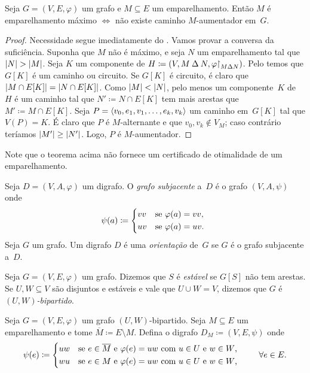 \documentclass[10pt,reqno]{amsart}
\begin{document}
\begin{theorem}
  Seja \(G = (V,E,\varphi)\) um grafo e \(M \subseteq E\) um
  emparelhamento.  Então \(M\) é emparelhamento máximo \(\iff\) não
  existe caminho \(M\)-aumentador em~\(G\).
\end{theorem}
\begin{proof}
  Necessidade segue imediatamente do .  Vamos provar a
  conversa da suficiência.  Suponha que \(M\) não é máximo, e seja
  \(N\) um emparelhamento tal que \(\lvert N\rvert > \lvert M\rvert\).  Seja \(K\)
  um componente de
  \(H \coloneqq (V, M \mathbin{\Delta} N, \varphi\mathord{\restriction}_{M
    \mathbin{\Delta} N})\).  Pelo  temos que \(G[K]\) é um
  caminho ou circuito.  Se \(G[K]\) é circuito, é claro que
  \(\lvert M \cap E[K]\rvert = \lvert N \cap E[K]\rvert\).  Como
  \(\lvert M\rvert < \lvert N\rvert\), pelo menos um componente~\(K\) de~\(H\) é
  um caminho tal que \(N' \coloneqq N \cap E[K]\) tem mais arestas que
  \(M' \coloneqq M \cap E[K]\).  Seja
  \(P = \langle v_0,e_1,v_1,\dotsc,e_k,v_k\rangle\) um caminho em~\(G[K]\) tal
  que \(V(P) = K\).  É claro que \(P\) é \(M\)-alternante e que
  \(v_0, v_k \not\in V_M\); caso contrário teríamos
  \(\lvert M'\rvert \geq \lvert N'\rvert\).  Logo, \(P\) é \(M\)-aumentador.
\end{proof}

Note que o teorema acima não fornece um certificado de otimalidade de
um emparelhamento.

Seja \(D = (V,A,\varphi)\) um digrafo.  O \emph{grafo subjacente}
a~\(D\) é o grafo \((V,A,\psi)\) onde
\begin{equation*}
  \psi(a)
  \coloneqq
  \begin{cases*}
    vv
    &
    se \(\varphi(a) = vv\),
    \\
    uv
    &
    se \(\varphi(a) = uv\).
  \end{cases*}
\end{equation*}
Seja \(G\) um grafo.  Um digrafo \(D\) é uma \emph{orientação}
de~\(G\) se \(G\) é o grafo subjacente a~\(D\).

Seja \(G = (V,E,\varphi)\) um grafo.  Dizemos que \(S\) é
\emph{estável} se \(G[S]\) não tem arestas.  Se \(U,W \subseteq V\)
são disjuntos e estáveis e vale que \(U \cup W = V\), dizemos que
\(G\) é \emph{\((U,W)\)-bipartido}.

Seja \(G = (V,E,\varphi)\) um grafo \((U,W)\)-bipartido.  Seja
\(M \subseteq E\) um emparelhamento e tome
\(\overline{M} \coloneqq E \setminus M\).  Defina o digrafo
\(D_M \coloneqq (V,E,\psi)\) onde
\begin{equation*}
  \psi(e)
  \coloneqq
  \begin{cases*}
    uw
    &
    se \(e \in \overline{M}\) e \(\varphi(e) = uw\) com \(u \in U\) e \(w \in W\),
    \\
    wu
    &
    se \(e \in M\) e \(\varphi(e) = uw\)  com \(u \in U\) e \(w \in W\),
  \end{cases*}
  \qquad
  \forall e \in E.
\end{equation*}
\end{document}

